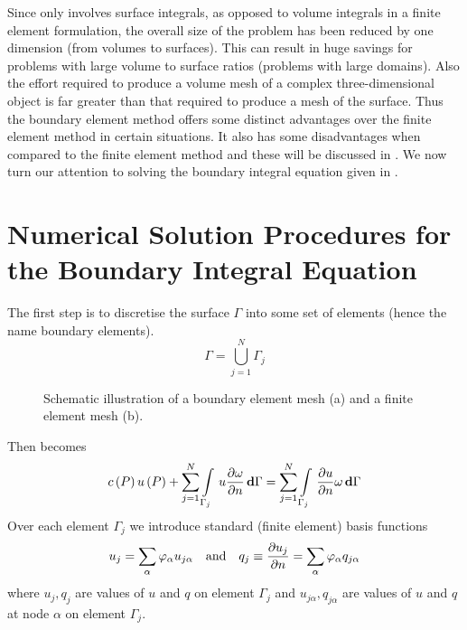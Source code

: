 Since  only involves surface integrals, as opposed to volume
integrals in a finite element formulation, the overall size of the problem has
been reduced by one dimension (from volumes to surfaces).  This can result in
huge savings for problems with large volume to surface ratios (\ie problems
with large domains).  Also the effort required to produce a volume mesh of a
complex three-dimensional object is far greater than that required to produce
a mesh of the surface.  Thus the boundary element method offers some distinct
advantages over the finite element method in certain situations.  It also has
some disadvantages when compared to the finite element method and these will
be discussed in .  We now turn our attention to
solving the boundary integral equation given in .

\section{Numerical Solution Procedures for the Boundary Integral Equation} 
\label{sec:Numsol}

The first step is to discretise the surface $\Gamma$ into some set of elements
(hence the name boundary elements).
\begin{equation}
  \Gamma = \displaystyle\bigcup_{j=1}^{N} \Gamma_{j}
  \label{eqn:ns1}
\end{equation}

\begin{figure}[htbp] \centering
  
  \caption{Schematic illustration of a boundary element mesh (a) and a finite 
    element mesh (b).}
  \label{fig:schemi}
\end{figure}

Then  becomes
\begin{equation}
   c\left( P \right)   u\left( P \right)  +  \displaystyle\sum_{j=1}^{N}    \displaystyle\int\limits_{\Gamma_{j}}^{} \,u  \dfrac{\partial \omega}{\partial n} \, \boldsymbol{\mathrm{d}} \Gamma   =  \displaystyle\sum_{j=1}^{N}    \displaystyle\int\limits_{\Gamma_{j}}^{} \, \dfrac{\partial u}{\partial n}  \omega\, \boldsymbol{\mathrm{d}} \Gamma 
  \label{eqn:ns2}
\end{equation}
Over each element $\Gamma_{j}$ we introduce standard (finite element) 
basis functions
\begin{equation}
  u_{j} =  \displaystyle\sum_{\alpha}^{}   \varphi_{\alpha}  u_{j\alpha} \quad \text{and} \quad
  q_{j} \equiv  \dfrac{\partial u_{j}}{\partial  n}  =  \displaystyle\sum_{\alpha}^{}   \varphi_{\alpha}  q_{j\alpha}
  \label{eqn:febf}
\end{equation}
where $u_{j}, q_{j}$ are values of $u$ and $q$ on element $\Gamma_{j}$ and
$u_{j\alpha}, q_{j\alpha}$ are values of $u$ and $q$ at node $\alpha$ on
element $\Gamma_{j}$.

